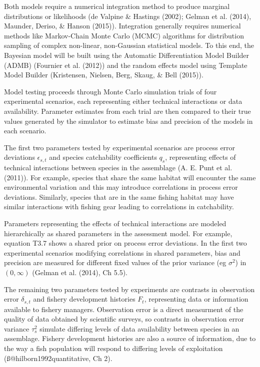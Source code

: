 \documentclass[12pt,]{scrartcl}
\begin{document}
Both models require a numerical integration method to produce marginal
distributions or likelihoods (de Valpine \& Hastings (2002); Gelman et
al. (2014), Maunder, Deriso, \& Hanson (2015)). Integration generally
requires numerical methods like Markov-Chain Monte Carlo (MCMC)
algorithms for distribution sampling of complex non-linear, non-Gaussian
statistical models. To this end, the Bayesian model will be built using
the Automatic Differentiation Model Builder (ADMB) (Fournier et al.
(2012)) and the random effects model using Template Model Builder
(Kristensen, Nielsen, Berg, Skaug, \& Bell (2015)).

Model testing proceeds through Monte Carlo simulation trials of four
experimental scenarios, each representing either technical interactions
or data availability. Parameter estimates from each trial are then
compared to their true values generated by the simulator to estimate
bias and precision of the models in each scenario.

The first two parameters tested by experimental scenarios are process
error deviations \(\epsilon_{s,t}\) and species catchability
coefficients \(q_s\), representing effects of technical interactions
between species in the assemblage (A. E. Punt et al. (2011)). For
example, species that share the same habitat will encounter the same
environmental variation and this may introduce correlations in process
error deviations. Similarly, species that are in the same fishing
habitat may have similar interactions with fishing gear leading to
correlations in catchability.

Parameters representing the effects of technical interactions are
modeled hierarchically as shared parameters in the assessment model. For
example, equation T3.7 shows a shared prior on process error deviations.
In the first two experimental scenarios modifying correlations in shared
parameters, bias and precision are measured for different fixed values
of the prior variance (eg \(\sigma^2\)) in \((0,\infty)\) (Gelman et al.
(2014), Ch 5.5).

The remaining two parameters tested by experiments are contrasts in
observation error \(\delta_{s,t}\) and fishery development histories
\(F_t\), representing data or information available to fishery managers.
Observation error is a direct measurment of the quality of data obtained
by scientific surveys, so contrasts in observation error variance
\(\tau_s^2\) simulate differing levels of data availability between
species in an assemblage. Fishery development histories are also a
source of information, due to the way a fish population will respond to
differing levels of exploitation (ß@hilborn1992quantitative, Ch 2).
\end{document}
